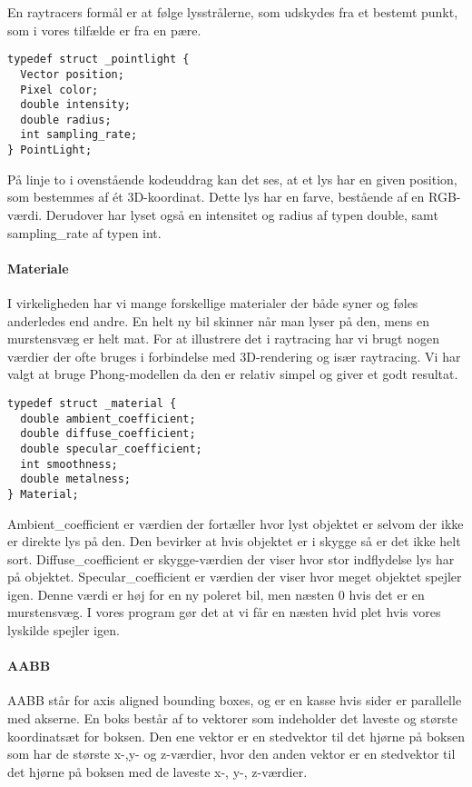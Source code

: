 En raytracers formål er at følge lysstrålerne, som udskydes fra et bestemt punkt, som i vores tilfælde er fra en pære. 

\begin{lstlisting}[style=Cstyle, caption=Struct til light]
typedef struct _pointlight {
  Vector position;
  Pixel color;
  double intensity;
  double radius;
  int sampling_rate;
} PointLight;
\end{lstlisting}

På linje to i ovenstående kodeuddrag kan det ses, at et lys har en given position, som bestemmes af ét 3D-koordinat. Dette lys har en farve, bestående af en RGB-værdi. Derudover har lyset også en intensitet og radius af typen double, samt sampling\_rate af typen int.

\paragraph{Materiale}
I virkeligheden har vi mange forskellige materialer der både syner og føles anderledes end andre. En helt ny bil skinner når man lyser på den, mens en murstensvæg er helt mat. For at illustrere det i raytracing har vi brugt nogen værdier der ofte bruges i forbindelse med 3D-rendering og især raytracing. Vi har valgt at bruge Phong-modellen da den er relativ simpel og giver et godt resultat.

\begin{lstlisting}[style=Cstyle, caption=Struct til Material]
typedef struct _material {
  double ambient_coefficient;
  double diffuse_coefficient;
  double specular_coefficient;
  int smoothness;
  double metalness; 
} Material;
\end{lstlisting}

Ambient\_coefficient er værdien der fortæller hvor lyst objektet er selvom der ikke er direkte lys på den. Den bevirker at hvis objektet er i skygge så er det ikke helt sort.
Diffuse\_coefficient er skygge-værdien der viser hvor stor indflydelse lys har på objektet. 
Specular\_coefficient er værdien der viser hvor meget objektet spejler igen. Denne værdi er høj for en ny poleret bil, men næsten 0 hvis det er en murstensvæg. I vores program gør det at vi får en næsten hvid plet hvis vores lyskilde spejler igen.

\paragraph{AABB}
AABB står for axis aligned bounding boxes, og er en kasse hvis sider er parallelle med akserne. En boks består af to vektorer som indeholder det laveste og største koordinatsæt for boksen. Den ene vektor er en stedvektor til det hjørne på boksen som har de største x-,y- og z-værdier, hvor den anden vektor er en stedvektor til det hjørne på boksen med de laveste x-, y-, z-værdier. 

